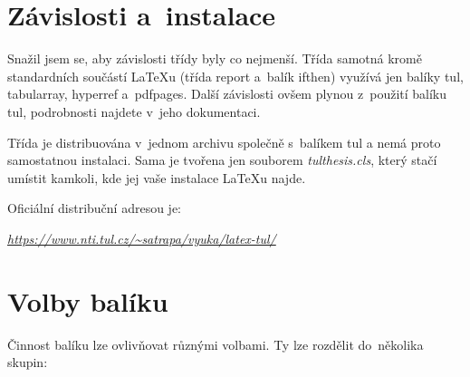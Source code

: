 \documentclass[a4paper,11pt,fonts,numbering,twoside,margins,listingsleft]{./tulpackage/tulthesis}
\newcommand{\argument}[1]{{\ttfamily\color{\tulcolor}#1}}
\begin{document}
\cleardoublepage%

\chapter{Závislosti a~instalace}

Snažil jsem se, aby závislosti třídy byly co nejmenší. Třída samotná kromě
standardních součástí \LaTeX{}u (třída \argument{report} a~balík
\argument{ifthen}) využívá jen balíky \argument{tul}, \argument{tabularray},
\argument{hyperref} a~\argument{pdfpages}. Další závislosti ovšem plynou
z~použití balíku \argument{tul}, podrobnosti najdete v~jeho dokumentaci.

Třída je distribuována v~jednom archivu společně s~balíkem \argument{tul} a
nemá proto samostatnou instalaci. Sama je tvořena jen souborem
\emph{tulthesis.cls}, který stačí umístit kamkoli, kde jej vaše instalace
\LaTeX{}u najde.

Oficiální distribuční adresou je:

\begin{listing}
    \href{https://www.nti.tul.cz/~satrapa/vyuka/latex-tul/}{\emph{https://www.nti.tul.cz/\textasciitilde satrapa/vyuka/latex-tul/}}
\end{listing}

\cleardoublepage%

\chapter{Volby balíku}\label{volby}

Činnost balíku lze ovlivňovat různými volbami. Ty lze rozdělit do~několika
skupin:
\end{document}
